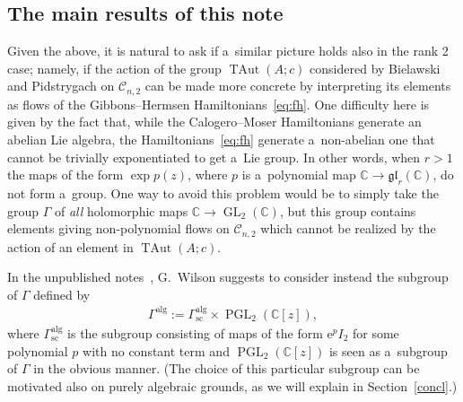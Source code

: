 \documentclass[pdftex]{sigma}
\newcommand{\bb}[1]{\mathbb{#1}}
\DeclareMathOperator{\GL}{GL}
\DeclareMathOperator{\PGL}{PGL}
\DeclareMathOperator{\TAut}{TAut}
\begin{document}
\subsection{The main results of this note}

Given the above, it is natural to ask if a~similar picture holds also in the rank 2 case; namely, if the
action of the group \(\TAut(A;c)\) considered by Bielawski and Pidstrygach on \(\mathcal{C}_{n,2}\) can be
made more concrete by interpreting its elements as f\/lows of the Gibbons--Hermsen
Hamiltonians~\eqref{eq:fh}.
One dif\/f\/iculty here is given by the fact that, while the Calogero--Moser Hamiltonians generate an
abelian Lie algebra, the Hamiltonians~\eqref{eq:fh} generate a~non-abelian one that cannot be trivially
exponentiated to get a~Lie group.
In other words, when \(r>1\) the maps of the form \(\exp p(z)\), where \(p\) is a~polynomial map
\(\bb{C}\to \mathfrak{gl}_{r}(\bb{C})\), do not form a~group.
One way to avoid this problem would be to simply take the group \(\Gamma\) of \emph{all} holomorphic maps
\(\bb{C}\to \GL_{2}(\bb{C})\), but this group contains elements giving non-polynomial f\/lows on
\(\mathcal{C}_{n,2}\) which cannot be realized by the action of an element in \(\TAut(A;c)\).

In the unpublished notes~\cite{wils09}, G.~Wilson suggests to consider instead the subgroup of \(\Gamma\)
def\/ined by
\begin{gather}
\label{eq:def-Galg}
\Gamma^{\mathrm{alg}}\mathrel{:=}\Gamma^{\mathrm{alg}}_{\text{sc}}\times\PGL_{2}(\bb{C}[z]),
\end{gather}
where \(\Gamma^{\mathrm{alg}}_{\text{sc}}\) is the subgroup consisting of maps of the form \(\mathrm{e}^{p}
I_{2}\) for some polynomial \(p\) with no constant term and \(\PGL_{2}(\bb{C}[z])\) is seen as a~subgroup
of \(\Gamma\) in the obvious manner.
(The choice of this particular subgroup can be motivated also on purely algebraic grounds, as we will
explain in Section~\ref{concl}.)
\end{document}
